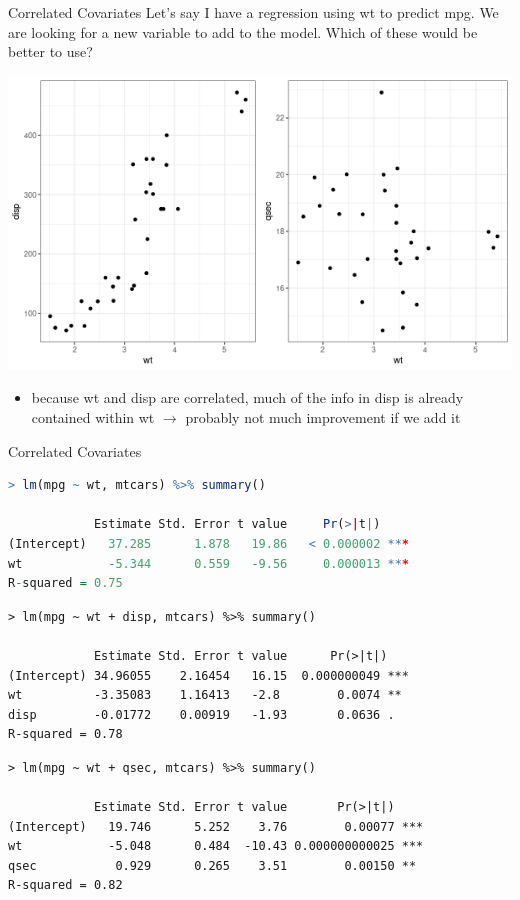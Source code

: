 \documentclass{beamer}
\begin{document}
\begin{frame}{Correlated Covariates}
Let's say I have a regression using wt to predict mpg. We are looking for a new variable to add to the model. Which of these would be better to use?
\begin{center}
\includegraphics[scale=0.45]{cor_compare.png}
\end{center}
\small
\begin{itemize}
    \item because wt and disp are correlated, much of the info in disp is already contained within wt $\rightarrow$ probably not much improvement if we add it
\end{itemize}
\end{frame}

\begin{frame}[fragile]{Correlated Covariates}

\begin{lstlisting}[language=R,basicstyle=\ttfamily\scriptsize]
> lm(mpg ~ wt, mtcars) %>% summary()

            Estimate Std. Error t value     Pr(>|t|)    
(Intercept)   37.285      1.878   19.86   < 0.000002 ***
wt            -5.344      0.559   -9.56     0.000013 ***
R-squared = 0.75
\end{lstlisting}
\begin{lstlisting}
> lm(mpg ~ wt + disp, mtcars) %>% summary()

            Estimate Std. Error t value      Pr(>|t|)    
(Intercept) 34.96055    2.16454   16.15  0.000000049 ***
wt          -3.35083    1.16413   -2.8        0.0074 ** 
disp        -0.01772    0.00919   -1.93       0.0636 .  
R-squared = 0.78
\end{lstlisting}
\begin{lstlisting}
> lm(mpg ~ wt + qsec, mtcars) %>% summary()

            Estimate Std. Error t value       Pr(>|t|)    
(Intercept)   19.746      5.252    3.76        0.00077 ***
wt            -5.048      0.484  -10.43 0.000000000025 ***
qsec           0.929      0.265    3.51        0.00150 ** 
R-squared = 0.82
\end{lstlisting}
\end{frame}
\end{document}
